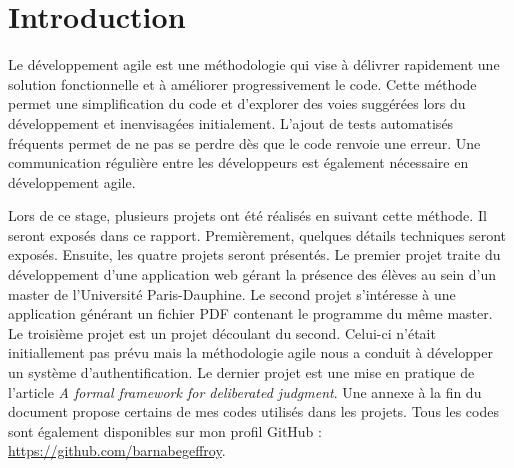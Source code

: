 \chapter*{Introduction}

Le développement agile est une méthodologie qui vise à délivrer rapidement une solution fonctionnelle et à améliorer progressivement le code. Cette méthode permet une simplification du code et d'explorer des voies suggérées lors du développement et inenvisagées initialement. L'ajout de tests automatisés fréquents permet de ne pas se perdre dès que le code renvoie une erreur. Une communication régulière entre les développeurs est également nécessaire en développement agile.

Lors de ce stage, plusieurs projets ont été réalisés en suivant cette méthode. Il seront exposés dans ce rapport. Premièrement, quelques détails techniques seront exposés. Ensuite, les quatre projets seront présentés. Le premier projet traite du développement d'une application web gérant la présence des élèves au sein d'un master de l'Université Paris-Dauphine. Le second projet s'intéresse à une application générant un fichier PDF contenant le programme du même master. Le troisième projet est un projet découlant du second. Celui-ci n'était initiallement pas prévu mais la méthodologie agile nous a conduit à développer un système d'authentification. Le dernier projet est une mise en pratique de l'article \textit{A formal framework for deliberated judgment}\cite{cailloux_formal_2020}. Une annexe à la fin du document propose certains de mes codes utilisés dans les projets. Tous les codes sont également disponibles sur mon profil GitHub : \url{https://github.com/barnabegeffroy}.